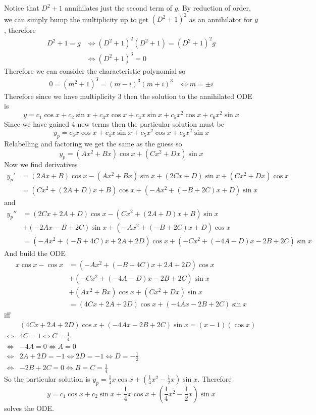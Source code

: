 \documentclass[notes]{subfiles}
\begin{document}
\begin{solution}
    Notice that $D^2 + 1$ annihilates just the second term of $g$. By reduction of order, we can simply bump the multiplicity up to get $(D^2 + 1)^2$ as an annihilator for $g$, therefore
    \begin{align*}
        D^2 + 1 = g
        &\iff (D^2 + 1)^2(D^2 + 1) = (D^2 + 1)^2 g \\
        &\iff (D^2 + 1)^3 = 0
    \end{align*}
    Therefore we can consider the characteristic polynomial so
    \begin{align*}
        0 = (m^2 + 1)^3 = (m - i)^3(m + i)^3
        &\iff m = \pm i
    \end{align*}
    Therefore since we have multiplicity $3$ then the solution to the annihilated ODE is
    \[
        y = c_1\cos x + c_2\sin x + c_3x\cos x + c_4x\sin x + c_5x^2\cos x + c_6x^2\sin x
    \]
    Since we have gained $4$ new terms then the particular solution must be
    \[
        y_p = c_3x\cos x + c_4x\sin x + c_5x^2\cos x + c_6x^2\sin x
    \]
    Relabelling and factoring we get the same as the guess so
    \[
        y_p = (Ax^2 + Bx)\cos x + (Cx^2 + Dx)\sin x
    \]
    Now we find derivatives
    \begin{align*}
        y_p'
        &= (2Ax + B)\cos x - (Ax^2 + Bx)\sin x + (2Cx + D)\sin x + (Cx^2 + Dx)\cos x \\
        &= (Cx^2 + (2A + D)x + B)\cos x + (-Ax^2 + (-B + 2C)x + D)\sin x
    \end{align*}
    and
    \begin{align*}
        y_p''
        &= (2Cx + 2A + D)\cos x - (Cx^2 + (2A + D)x + B)\sin x \\ &+ (-2Ax - B + 2C)\sin x + (-Ax^2 + (-B + 2C)x + D)\cos x \\
        &= (-Ax^2 + (-B + 4C)x + 2A + 2D)\cos x + (-Cx^2 + (-4A - D)x - 2B + 2C)\sin x
    \end{align*}
    And build the ODE
    \begin{align*}
        x\cos x - \cos x
        &= (-Ax^2 + (-B + 4C)x + 2A + 2D)\cos x \\
        &+ (-Cx^2 + (-4A - D)x - 2B + 2C)\sin x \\
        &+ (Ax^2 + Bx)\cos x + (Cx^2 + Dx)\sin x \\
        &= (4Cx + 2A + 2D)\cos x + (-4Ax - 2B + 2C)\sin x
    \end{align*}
    iff
    \begin{align*}
        &(4Cx + 2A + 2D)\cos x + (-4Ax - 2B + 2C)\sin x = (x - 1)(\cos x) \\
        \iff& 4C = 1 \iff C = \frac{1}{4} \\
        \iff& -4A = 0 \iff A = 0 \\
        \iff& 2A + 2D = -1 \iff 2D = -1 \iff D = -\frac{1}{2} \\
        \iff& -2B + 2C = 0 \iff B = C = \frac{1}{4}
    \end{align*}
    So the particular solution is $y_p = \frac{1}{4}x\cos x + \left( \frac{1}{4}x^2 - \frac{1}{2}x \right)\sin x$. Therefore
    \[
        y = c_1 \cos x + c_2 \sin x + \frac{1}{4}x\cos x + \left( \frac{1}{4}x^2 - \frac{1}{2}x \right)\sin x
    \]
    solves the ODE.
\end{solution}
\end{document}
